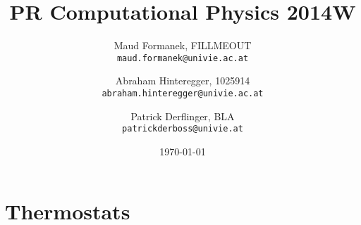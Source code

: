 \documentclass[a4paper]{article}
\title{PR Computational Physics 2014W}
\author{
	Maud Formanek, FILLMEOUT\\
    \texttt{maud.formanek@univie.ac.at}
	\and
    Abraham Hinteregger,  1025914\\
    \texttt{abraham.hinteregger@univie.ac.at}\and
    Patrick Derflinger,  BLA\\
    \texttt{patrickderboss@univie.at}
    }
\date{\today}
\begin{document}
\maketitle
\tableofcontents

\section{Thermostats}


\end{document}

